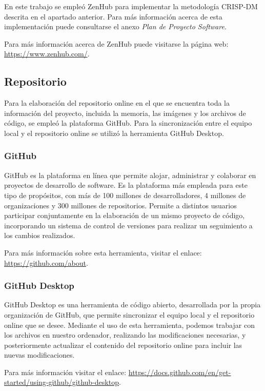 En este trabajo se empleó ZenHub para implementar la metodología CRISP-DM descrita en el apartado anterior. Para más información acerca de esta implementación puede consultarse el anexo \textit{Plan de Proyecto Software}.

Para más información acerca de ZenHub puede visitarse la página web: \url{https://www.zenhub.com/}.

\subsection{Repositorio}

Para la elaboración del repositorio online en el que se encuentra toda la información del proyecto, incluida la memoria, las imágenes y los archivos de código, se empleó la plataforma GitHub. Para la sincronización entre el equipo local y el repositorio online se utilizó la herramienta GitHub Desktop.

\subsubsection{GitHub}

GitHub es la plataforma en línea que permite alojar, administrar y colaborar en proyectos de desarrollo de software. Es la plataforma más empleada para este tipo de propósitos, con más de 100 millones de desarrolladores, 4 millones de organizaciones y 300 millones de repositorios. Permite a distintos usuarios participar conjuntamente en la elaboración de un mismo proyecto de código, incorporando un sistema de control de versiones para realizar un seguimiento a los cambios realizados.

Para más información sobre esta herramienta, visitar el enlace: \url{https://github.com/about}. 

\subsubsection{GitHub Desktop}

GitHub Desktop es una herramienta de código abierto, desarrollada por la propia organización de GitHub, que permite sincronizar el equipo local y el repositorio online que se desee. Mediante el uso de esta herramienta, podemos trabajar con los archivos en nuestro ordenador, realizando las modificaciones necesarias, y posteriormente actualizar el contenido del repositorio online para incluir las nuevas modificaciones.

Para más información visitar el enlace: \url{https://docs.github.com/en/get-started/using-github/github-desktop}. 

